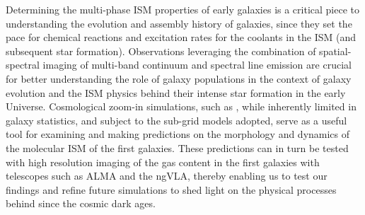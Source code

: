 \IfFileExists{emulateapjlegacy.cls}{\documentclass[iop]{emulateapjlegacy}}{\documentclass[iop]{emulateapj}}
\begin{document}
Determining the multi-phase ISM properties of early galaxies
is a critical piece to understanding the evolution and
assembly history of galaxies, since they set the pace
for chemical reactions and excitation rates for the coolants in the ISM (and subsequent star formation).
Observations leveraging the combination of spatial-spectral imaging of
multi-band continuum and spectral line emission are crucial for better understanding
the role of \highz galaxy populations
in the context of galaxy evolution and the ISM physics behind their intense star formation in the early Universe.
Cosmological zoom-in simulations, such as , while inherently limited in galaxy
statistics, and subject to the sub-grid models adopted,
serve as a useful tool for examining and making predictions on the
morphology and dynamics of 
the molecular ISM of the first galaxies.
These predictions can in turn be
tested with high resolution imaging of the gas content in the first galaxies with telescopes such as ALMA and the ngVLA, thereby
enabling us to test our findings and refine future simulations to shed light on the physical processes behind
\SF since the cosmic dark ages.


\acknowledgements
\end{document}
